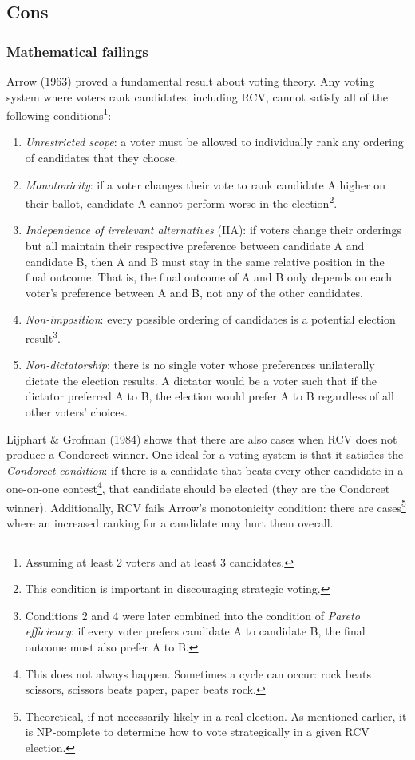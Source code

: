 \documentclass[12pt,twoside]{reedthesis}
\begin{document}
\hypertarget{cons}{%
\subsection{Cons}\label{cons}}

\hypertarget{mathematical-failings}{%
\subsubsection{Mathematical failings}\label{mathematical-failings}}

Arrow (1963) proved a fundamental result about voting theory. Any voting system where voters rank candidates, including RCV, cannot satisfy all of the following conditions\footnote{Assuming at least 2 voters and at least 3 candidates.}:
\begin{enumerate}
\def\labelenumi{\arabic{enumi}.}
\item
  \emph{Unrestricted scope}: a voter must be allowed to individually rank any ordering of candidates that they choose.
\item
  \emph{Monotonicity}: if a voter changes their vote to rank candidate A higher on their ballot, candidate A cannot perform worse in the election\footnote{This condition is important in discouraging strategic voting.}.
\item
  \emph{Independence of irrelevant alternatives} (IIA): if voters change their orderings but all maintain their respective preference between candidate A and candidate B, then A and B must stay in the same relative position in the final outcome. That is, the final outcome of A and B only depends on each voter's preference between A and B, not any of the other candidates.
\item
  \emph{Non-imposition}: every possible ordering of candidates is a potential election result\footnote{Conditions 2 and 4 were later combined into the condition of \emph{Pareto efficiency}: if every voter prefers candidate A to candidate B, the final outcome must also prefer A to B.}.
\item
  \emph{Non-dictatorship}: there is no single voter whose preferences unilaterally dictate the election results. A dictator would be a voter such that if the dictator preferred A to B, the election would prefer A to B regardless of all other voters' choices.
\end{enumerate}
Lijphart \& Grofman (1984) shows that there are also cases when RCV does not produce a Condorcet winner. One ideal for a voting system is that it satisfies the \emph{Condorcet condition}: if there is a candidate that beats every other candidate in a one-on-one contest\footnote{This does not always happen. Sometimes a cycle can occur: rock beats scissors, scissors beats paper, paper beats rock.}, that candidate should be elected (they are the Condorcet winner). Additionally, RCV fails Arrow's monotonicity condition: there are cases\footnote{Theoretical, if not necessarily likely in a real election. As mentioned earlier, it is NP-complete to determine how to vote strategically in a given RCV election.} where an increased ranking for a candidate may hurt them overall.
\end{document}
